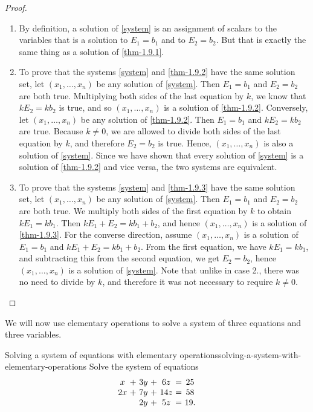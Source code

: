 \begin{proof}
\begin{enumerate}
\item By definition, a solution of \eqref{system} is an assignment of
  scalars to the variables that is a solution to $E_1=b_1$ and to
  $E_2=b_2$. But that is exactly the same thing as a solution of
  \eqref{thm-1.9.1}.

\item To prove that the systems \eqref{system} and \eqref{thm-1.9.2}
  have the same solution set, let $(x_{1},\ldots,x_{n})$ be
  any solution of \eqref{system}. Then $E_1=b_1$ and $E_2=b_2$ are
  both true. Multiplying both sides of the last equation by $k$, we
  know that $kE_2=kb_2$ is true, and so
  $(x_{1},\ldots,x_{n})$ is a solution of
  \eqref{thm-1.9.2}. Conversely, let $(x_{1},\ldots,x_{n})$
  be any solution of \eqref{thm-1.9.2}.  Then $E_1=b_1$ and $kE_2=kb_2$
  are true. Because $k\neq 0$, we are allowed to divide both sides of
  the last equation by $k$, and therefore $E_2=b_2$ is true. Hence,
  $(x_{1},\ldots,x_{n})$ is also a solution of
  \eqref{system}. Since we have shown that every solution of
  \eqref{system}  is a solution of \eqref{thm-1.9.2} and vice versa,
  the two systems are equivalent.

\item To prove that the systems \eqref{system} and \eqref{thm-1.9.3}
  have the same solution set, let $(x_{1},\ldots,x_{n})$ be
  any solution of \eqref{system}. Then $E_1=b_1$ and $E_2=b_2$ are
  both true. We multiply both sides of the first equation by $k$ to
  obtain $kE_1=kb_1$. Then $kE_1+E_2 = kb_1+b_2$, and hence
  $(x_{1},\ldots,x_{n})$ is a solution of
  \eqref{thm-1.9.3}. For the converse direction, assume
  $(x_{1},\ldots,x_{n})$ is a solution of $E_1=b_1$ and
  $kE_1+E_2 = kb_1+b_2$. From the first equation, we have $kE_1=kb_1$,
  and subtracting this from the second equation, we get $E_2=b_2$,
  hence $(x_{1},\ldots,x_{n})$ is a solution of
  \eqref{system}. Note that unlike in case 2., there was no need to
  divide by $k$, and therefore it was not necessary to require $k\neq 0$.
\end{enumerate}
\end{proof}

We will now use elementary operations to solve a system of three
equations and three variables.

\begin{example}{Solving a system of equations with elementary operations}{solving-a-system-with-elementary-operations}
Solve the system of equations
\begin{equation*}
\begin{array}{c@{~}c@{~}c@{~}c@{~}c@{~}c@{~}c}
x&+&3y&+&6z&=&25 \\
2x&+&7y&+&14z&=&58 \\
&&2y&+&5z&=&19.
\end{array}
\label{solving-a-system1}
\end{equation*}
\end{example}

